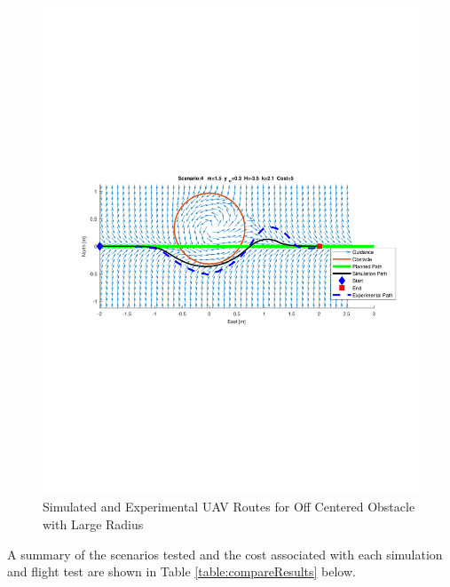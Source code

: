 \documentclass[numbered,pdftex]{ohio-etd}
\begin{document}
\begin{figure}[H]
	\centering
	\includegraphics[trim = 50 275 0 250, clip, width=16.5cm]{Figures/results/compareFigures/4Quiver}
	\caption{Simulated and Experimental UAV Routes for Off Centered Obstacle with Large Radius}
	\label{fig:4Quiver}
\end{figure}

A summary of the scenarios tested and the cost associated with each simulation and flight test are shown in Table \ref{table:compareResults} below. 
\end{document}
